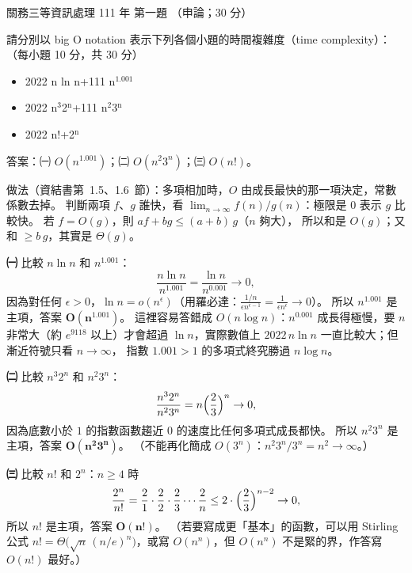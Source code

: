 \begin{pastexam}[label={px:gw3-111-ds-01}]{關務三等資訊處理 111 年 第一題}
（申論；30 分）

請分別以 big O notation 表示下列各個小題的時間複雜度（time complexity）：（每小題 10 分，共 30 分）
\begin{itemize}[leftmargin=2.2em]
\item[㈠] 2022 n ln n+111 n$^{1.001}$
\item[㈡] 2022 n$^3$2$^\text{n}$+111 n$^2$3$^\text{n}$
\item[㈢] 2022 n!+2$^\text{n}$
\end{itemize}
\end{pastexam}

\begin{pastsoln}
答案：㈠ $O(n^{1.001})$；㈡ $O(n^2 3^n)$；㈢ $O(n!)$。

做法（資結書第~1.5、1.6~節）：多項相加時，$O$ 由成長最快的那一項決定，常數係數去掉。 判斷兩項 $f$、$g$ 誰快，看
$\lim_{n\to\infty} f(n)/g(n)$：極限是 $0$ 表示 $g$ 比較快。 若 $f = O(g)$，則 $af + bg \le (a + b)\,g$（$n$ 夠大），
所以和是 $O(g)$；又和 $\ge b\,g$，其實是 $\Theta(g)$。

\textbf{㈠} 比較 $n \ln n$ 和 $n^{1.001}$：
\[
\frac{n \ln n}{n^{1.001}} = \frac{\ln n}{n^{0.001}} \to 0,
\]
因為對任何 $\epsilon > 0$，$\ln n = o(n^{\epsilon})$（用羅必達：$\frac{1/n}{\epsilon n^{\epsilon - 1}} = \frac{1}{\epsilon n^{\epsilon}}
\to 0$）。 所以 $n^{1.001}$ 是主項，答案 $\mathbf{O(n^{1.001})}$。 這裡容易答錯成 $O(n \log n)$：$n^{0.001}$ 成長得極慢，要
$n$ 非常大（約 $e^{9118}$ 以上）才會超過 $\ln n$，實際數值上 $2022\,n \ln n$ 一直比較大；但漸近符號只看 $n \to \infty$，
指數 $1.001 > 1$ 的多項式終究勝過 $n \log n$。

\textbf{㈡} 比較 $n^3 2^n$ 和 $n^2 3^n$：
\[
\frac{n^3 2^n}{n^2 3^n} = n \Bigl(\frac{2}{3}\Bigr)^n \to 0,
\]
因為底數小於 $1$ 的指數函數趨近 $0$ 的速度比任何多項式成長都快。 所以 $n^2 3^n$ 是主項，答案 $\mathbf{O(n^2 3^n)}$。
（不能再化簡成 $O(3^n)$：$n^2 3^n / 3^n = n^2 \to \infty$。）

\textbf{㈢} 比較 $n!$ 和 $2^n$：$n \ge 4$ 時
\[
\frac{2^n}{n!} = \frac{2}{1} \cdot \frac{2}{2} \cdot \frac{2}{3} \cdots \frac{2}{n} \le 2 \cdot \Bigl(\frac{2}{3}\Bigr)^{n-2} \to 0,
\]
所以 $n!$ 是主項，答案 $\mathbf{O(n!)}$。 （若要寫成更「基本」的函數，可以用 Stirling 公式
$n! = \Theta\bigl(\sqrt{n}\,(n/e)^n\bigr)$，或寫 $O(n^n)$，但 $O(n^n)$ 不是緊的界，作答寫 $O(n!)$ 最好。）
\end{pastsoln}
